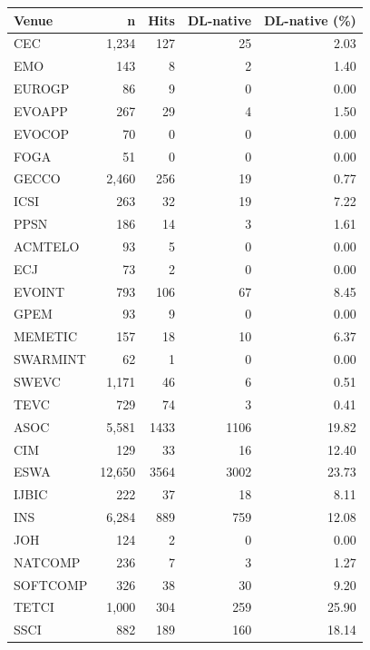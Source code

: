 \begin{tabular}{@{}lrrrr@{}}
\toprule
Venue & n & Hits & DL-native & DL-native (\%) \\
\midrule
CEC & 1,234 & 127 & 25 & 2.03 \\
EMO & 143 & 8 & 2 & 1.40 \\
EUROGP & 86 & 9 & 0 & 0.00 \\
EVOAPP & 267 & 29 & 4 & 1.50 \\
EVOCOP & 70 & 0 & 0 & 0.00 \\
FOGA & 51 & 0 & 0 & 0.00 \\
GECCO & 2,460 & 256 & 19 & 0.77 \\
ICSI & 263 & 32 & 19 & 7.22 \\
PPSN & 186 & 14 & 3 & 1.61 \\
ACMTELO & 93 & 5 & 0 & 0.00 \\
ECJ & 73 & 2 & 0 & 0.00 \\
EVOINT & 793 & 106 & 67 & 8.45 \\
GPEM & 93 & 9 & 0 & 0.00 \\
MEMETIC & 157 & 18 & 10 & 6.37 \\
SWARMINT & 62 & 1 & 0 & 0.00 \\
SWEVC & 1,171 & 46 & 6 & 0.51 \\
TEVC & 729 & 74 & 3 & 0.41 \\
ASOC & 5,581 & 1433 & 1106 & 19.82 \\
CIM & 129 & 33 & 16 & 12.40 \\
ESWA & 12,650 & 3564 & 3002 & 23.73 \\
IJBIC & 222 & 37 & 18 & 8.11 \\
INS & 6,284 & 889 & 759 & 12.08 \\
JOH & 124 & 2 & 0 & 0.00 \\
NATCOMP & 236 & 7 & 3 & 1.27 \\
SOFTCOMP & 326 & 38 & 30 & 9.20 \\
TETCI & 1,000 & 304 & 259 & 25.90 \\
SSCI & 882 & 189 & 160 & 18.14 \\
\bottomrule
\end{tabular}
